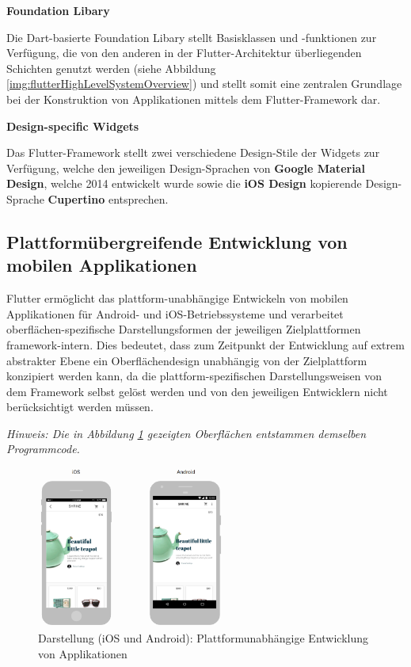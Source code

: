 \documentclass[bibliography=totoc,listof=totoc,BCOR=5mm,DIV=12,oneside]{scrbook}
\begin{document}
\par \bigskip \textbf{Foundation Libary}
\par Die Dart-basierte Foundation Libary\citep{FoundationLibary} stellt Basisklassen und -funktionen zur Verfügung, die von den anderen in der Flutter-Architektur überliegenden Schichten genutzt werden (siehe Abbildung \ref{img:flutterHighLevelSystemOverview}) und stellt somit eine zentralen Grundlage bei der Konstruktion von Applikationen mittels dem Flutter-Framework dar.

\par \bigskip \textbf{Design-specific Widgets}
\par Das Flutter-Framework stellt zwei verschiedene Design-Stile der Widgets zur Verfügung, welche den jeweiligen Design-Sprachen von \textbf{Google Material Design}\citep{Mat1}, welche 2014 entwickelt wurde sowie die \textbf{iOS Design}\citep{iOSDesign} kopierende Design-Sprache \textbf{Cupertino}\citep{Cup1} entsprechen.

\subsection{Plattformübergreifende Entwicklung von mobilen Applikationen}
\par Flutter ermöglicht das plattform-unabhängige Entwickeln von mobilen Applikationen für Android- und iOS-Betriebssysteme und verarbeitet oberflächen-spezifische Darstellungsformen der jeweiligen Zielplattformen framework-intern. Dies bedeutet, dass zum Zeitpunkt der Entwicklung auf extrem abstrakter Ebene ein Oberflächendesign unabhängig von der Zielplattform konzipiert werden kann, da die plattform-spezifischen Darstellungsweisen von dem Framework selbst gelöst werden und von den jeweiligen Entwicklern nicht berücksichtigt werden müssen. 
\par \bigskip \textit{Hinweis: Die in Abbildung \ref{img:FlutterVisualisierungiOSAndoid} gezeigten Oberflächen entstammen demselben Programmcode.}

\bigskip
\begin{figure}[H]
	\centering
	\includegraphics[width=0.55\textwidth, keepaspectratio]{Bilder/PlattformUebergreifendDesign.png}
	\caption{Darstellung (iOS und Android): Plattformunabhängige Entwicklung von Applikationen \cite[What is Flutter?]{Flu8}}
	\label{img:FlutterVisualisierungiOSAndoid}
\end{figure}
\end{document}
